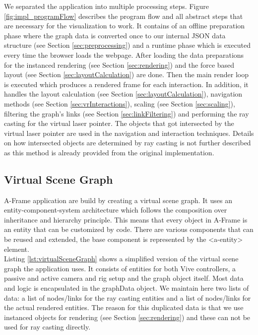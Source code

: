We separated the application into multiple processing steps. Figure \ref{fig:impl_programFlow} describes the program flow and all abstract steps that are necessary for the visualization to work.
It contains of an offline preparation phase where the graph data is converted once to our internal JSON data structure (see Section \ref{sec:preprocessing}) and a runtime phase which is executed every time the browser loads the webpage.
After loading the data preparations for the instanced rendering (see Section \ref{sec:rendering}) and the force based layout (see Section \ref{sec:layoutCalculation}) are done.
Then the main render loop is executed which produces a rendered frame for each interaction. In addition, it handles the layout calculation (see Section \ref{sec:layoutCalculation}), navigation methods (see Section \ref{sec:vrInteractions}), scaling (see Section \ref{sec:scaling}), filtering the graph's links (see Section \ref{sec:linkFiltering}) and performing the ray casting for the virtual laser pointer.
The objects that got intersected by the virtual laser pointer are used in the navigation and interaction techniques. 
Details on how intersected objects are determined by ray casting is not further described as this method is already provided from the original implementation. 

\subsection{Virtual Scene Graph}
A-Frame application are build by creating a virtual scene graph.
It uses an entity-component-system architecture which follows the  composition over inheritance and hierarchy principle. 
This means that every object in A-Frame is an entity that can be customized by code.
There are various components that can be reused and extended, the base component is represented by the <a-entity> element.\\
Listing \ref{lst:virtualSceneGraph} shows a simplified version of the virtual scene graph the application uses. 
It consists of entities for both Vive controllers, a passive and active camera and rig setup and the graph object itself.
Most data and logic is encapsulated in the graphData object. We maintain here two lists of data: a list of nodes/links for the ray casting entities and a list of nodes/links for the actual rendered entities. 
The reason for this duplicated data is that we use  instanced objects for rendering (see Section \ref{sec:rendering}) and these can not be used for ray casting directly.

